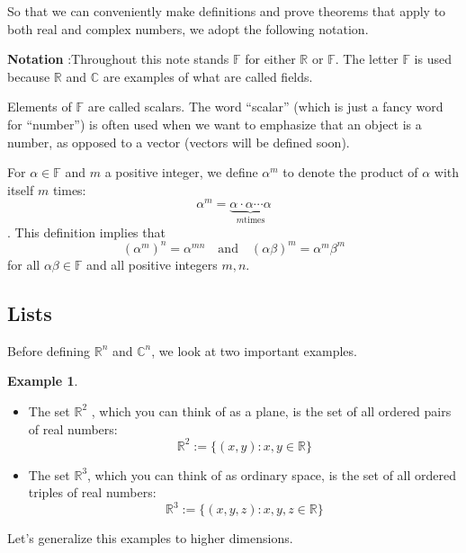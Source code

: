 \documentclass[
]{book}
\providecommand{\tightlist}{%
  \setlength{\itemsep}{0pt}\setlength{\parskip}{0pt}}
\theoremstyle{definition}
\theoremstyle{definition}
\newtheorem{example}{Example}[chapter]
\theoremstyle{definition}
\theoremstyle{definition}
\theoremstyle{remark}
\begin{document}
So that we can conveniently make definitions and prove theorems that apply to both real and complex numbers, we adopt the following notation.

\textbf{Notation} :Throughout this note stands \(\mathbb{F}\) for either \(\mathbb{R}\) or \(\mathbb{F}\). The letter \(\mathbb{F}\) is used because \(\mathbb{R}\) and \(\mathbb{C}\) are examples of what are called fields.

Elements of \(\mathbb{F}\) are called scalars. The word ``scalar'' (which is just a fancy word for ``number'') is often used when we want to emphasize that an object is a number, as opposed to a vector (vectors will be defined soon).

For \(\alpha \in \mathbb{F}\) and \(m\) a positive integer, we define \(\alpha^m\) to denote the product of \(\alpha\) with itself \(m\) times:
\[\alpha^m=\underbrace{\alpha\cdot \alpha \cdots \alpha}_{ m \text{times}}\].
This definition implies that
\[(\alpha^m)^n=\alpha^{mn}\quad \text {and} \quad(\alpha\beta)^m=\alpha^m\beta^m\]
for all \(\alpha\beta\in \mathbb{F}\) and all positive integers \(m,n\).

\subsection{Lists}\label{lists}

Before defining \(\mathbb{R}^n\) and \(\mathbb{C}^n\), we look at two important examples.

\begin{example}
\protect\hypertarget{exm:unnamed-chunk-6}{}\label{exm:unnamed-chunk-6}\leavevmode

\begin{itemize}
\tightlist
\item
  The set \(\mathbb{R}^2\) , which you can think of as a plane, is the set of all ordered pairs of real numbers:
  \[\mathbb{R}^2:=\{(x,y):x,y\in \mathbb{R}\}\]
\item
  The set \(\mathbb{R}^3\), which you can think of as ordinary space, is the set of all ordered triples of real numbers:
  \[\mathbb{R}^3:=\{(x,y,z):x,y,z\in \mathbb{R}\}\]
\end{itemize}

\end{example}

Let's generalize this examples to higher dimensions.
\end{document}
